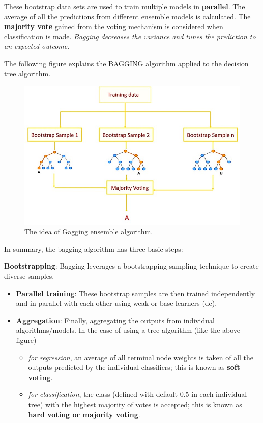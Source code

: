 \documentclass[
]{book}
\providecommand{\tightlist}{%
  \setlength{\itemsep}{0pt}\setlength{\parskip}{0pt}}
\begin{document}
These bootstrap data sets are used to train multiple models in \textbf{parallel}. The average of all the predictions from different ensemble models is calculated. The \textbf{majority vote} gained from the voting mechanism is considered when classification is made. \emph{\color{red}Bagging decreases the variance and tunes the prediction to an expected outcome}.

The following figure explains the BAGGING algorithm applied to the decision tree algorithm.

\begin{figure}

{\centering \includegraphics[width=0.8\linewidth]{img09/w09-BAGGING} 

}

\caption{The idea of Gagging ensemble algorithm.}\label{fig:unnamed-chunk-230}
\end{figure}

In summary, the bagging algorithm has three basic steps:

\textbf{Bootstrapping}: Bagging leverages a bootstrapping sampling technique to create diverse samples.

\begin{itemize}
\item
  \textbf{Parallel training}: These bootstrap samples are then trained independently and in parallel with each other using weak or base learners (de).
\item
  \textbf{Aggregation}: Finally, aggregating the outputs from individual algorithms/models. In the case of using a tree algorithm (like the above figure)

  \begin{itemize}
  \tightlist
  \item
    \emph{\color{red}for regression}, an average of all terminal node weights is taken of all the outputs predicted by the individual classifiers; this is known as \textbf{soft voting}.
  \item
    \emph{\color{red}for classification}, the class (defined with default 0.5 in each individual tree) with the highest majority of votes is accepted; this is known as \textbf{hard voting or majority voting}.
  \end{itemize}
\end{itemize}
\end{document}
